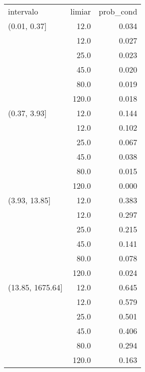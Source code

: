 \begin{table}[ht]
\centering
\begin{tabular}{lrr}
 intervalo & limiar & prob\_cond \\ 
 (0.01, 0.37] & 12.0 & 0.034 \\ 
   & 12.0 & 0.027 \\ 
   & 25.0 & 0.023 \\ 
   & 45.0 & 0.020 \\ 
   & 80.0 & 0.019 \\ 
   & 120.0 & 0.018 \\ 
  (0.37, 3.93] & 12.0 & 0.144 \\ 
   & 12.0 & 0.102 \\ 
   & 25.0 & 0.067 \\ 
   & 45.0 & 0.038 \\ 
   & 80.0 & 0.015 \\ 
   & 120.0 & 0.000 \\ 
  (3.93, 13.85] & 12.0 & 0.383 \\ 
   & 12.0 & 0.297 \\ 
   & 25.0 & 0.215 \\ 
   & 45.0 & 0.141 \\ 
   & 80.0 & 0.078 \\ 
   & 120.0 & 0.024 \\ 
  (13.85, 1675.64] & 12.0 & 0.645 \\ 
   & 12.0 & 0.579 \\ 
   & 25.0 & 0.501 \\ 
   & 45.0 & 0.406 \\ 
   & 80.0 & 0.294 \\ 
   & 120.0 & 0.163 \\ 
  \end{tabular}
\end{table}
